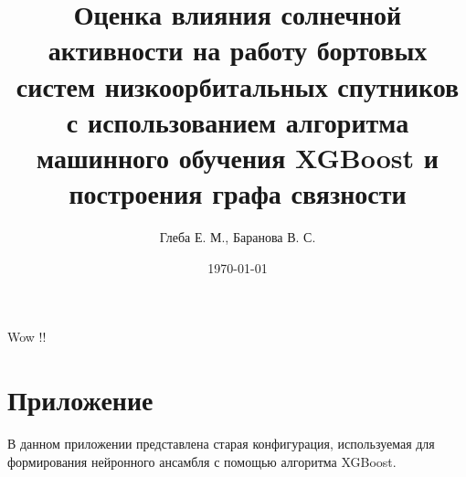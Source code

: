 \documentclass[14pt, a4paper]{src/bsu}
\title{Оценка влияния солнечной активности на работу бортовых систем
  низкоорбитальных спутников с использованием алгоритма машинного обучения
XGBoost и построения графа связности}
\author{Глеба Е. М., Баранова В. С.}
\date{\today}
\begin{document}

Wow \cite{green_2017_impact} !!

\newpage


\newpage

\titleformat{\section}[block]{\large\bfseries\filcenter}{}{0em}{}

\newpage

\printbibliography[heading=bibintoc,title={Список использованной литературы}]

\newpage

\appendix

\renewcommand{\chaptermark}[1]{\markboth{}{}}
\renewcommand{\sectionmark}[1]{\markright{\arabic{section}.\ #1}}

\titleformat{\section}[block]{\large\bfseries\filcenter}{}{0em}{}

 \label{sec:attachements}

\section{Приложение }
\label{subsec:old_polaris_learn_config}

В данном приложении представлена старая конфигурация, используемая для формирования нейронного ансамбля с помощью алгоритма XGBoost.

%
\end{document}
